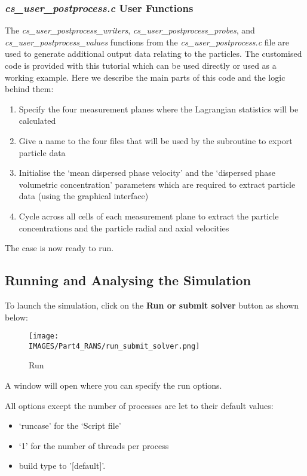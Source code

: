 \subsubsection{\textit{cs\_user\_postprocess.c} User Functions} \label{lag:cs_user_postprocess.c}

The \textit{cs\_user\_postprocess\_writers}, \textit{cs\_user\_postprocess\_probes}, and \textit{cs\_user\_postprocess\_values} functions from the \textit{cs\_user\_postprocess.c} file are used to generate additional output data relating to the particles. The customised code is provided with this tutorial which can be used directly or used as a working example.  Here we describe the main parts of this code and the logic behind them:

\begin{enumerate}
\item Specify the four measurement planes where the Lagrangian statistics will be calculated
\item Give a name to the four files that will be used by the subroutine to export particle data
\item Initialise the ‘mean dispersed phase velocity’ and the ‘dispersed phase volumetric concentration’ parameters which are required to extract particle data (using the graphical interface)
\item Cycle across all cells of each measurement plane to extract the particle concentrations and the particle radial and axial velocities
\end{enumerate}

The case is now ready to run.

\subsection{Running and Analysing the Simulation}

To launch the simulation, click on the {\color{eblue} \bf Run or submit solver} button as shown below:

\begin{figure}[H] 
\centering
\texttt{[image: \\IMAGES/Part4\_RANS/run\_submit\_solver.png]} 
\caption{Run}
\label{lag:cap1_run}
\end{figure}

A window will open where you can specify the run options.

All options except the number of processes are let to their default values:

\begin{itemize}
\item ‘runcase’ for the ‘Script file’
\item ‘1’ for the number of threads per process
\item build type to '[default]'.
\end{itemize}

